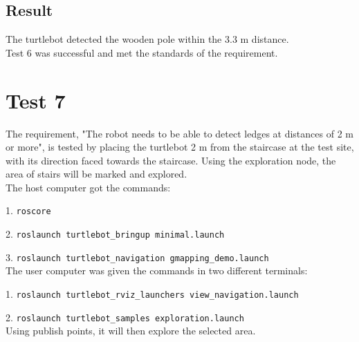 \subsection{Result}
The turtlebot detected the wooden pole within the 3.3 m distance.\\
Test 6 was successful and met the standards of the requirement.

%
%
%
%

\section{Test 7} 
The requirement, "The robot needs to be able to detect ledges at distances of 2 m or more", is tested by placing the turtlebot 2 m from the staircase at the test site, with its direction faced towards the staircase. Using the exploration node, the area of stairs will be marked and explored.\\ 
\newline
The host computer got the commands:

1. \texttt{roscore} 

2. \texttt{roslaunch turtlebot\_bringup minimal.launch}

3. \texttt{roslaunch turtlebot\_navigation gmapping\_demo.launch}\\
The user computer was given the commands in two different terminals:

1. \texttt{roslaunch turtlebot\_rviz\_launchers view\_navigation.launch}

2. \texttt{roslaunch turtlebot\_samples exploration.launch}\\
Using publish points, it will then explore the selected area.

